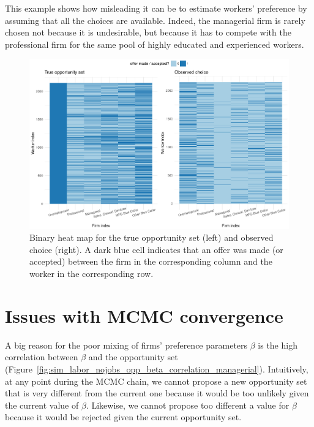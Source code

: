 This example shows how misleading it can be to estimate workers' preference by
assuming that all the choices are available. Indeed, the managerial firm is
rarely chosen not because it is undesirable, but because it has to compete with
the professional firm for the same pool of highly educated and experienced
workers.

\begin{figure}[tbp]
  \centering
  \includegraphics[width=\textwidth,keepaspectratio]{../figure/sim_labor_nojobs_trueopp_obschoice}
  \caption[True opportunity set vs observed choice.]{Binary heat map for the
    true opportunity set (left) and observed choice (right). A dark blue cell
    indicates that an offer was made (or accepted) between the firm in the
    corresponding column and the worker in the corresponding row.}
  \label{fig:sim_labor_nojobs_trueopp_obschoice}
\end{figure}

\section{Issues with MCMC convergence}
\label{sec:simulation_beta_opp_correlation}

A big reason for the poor mixing of firms' preference parameters $\beta$ is the
high correlation between $\beta$ and the opportunity set (Figure~\ref{fig:sim_labor_nojobs_opp_beta_correlation_managerial}). Intuitively, at any
point during the MCMC chain, we cannot propose a new opportunity set that is
very different from the current one because it would be too unlikely given the
current value of $\beta$. Likewise, we cannot propose too different a value for
$\beta$ because it would be rejected given the current opportunity set.

